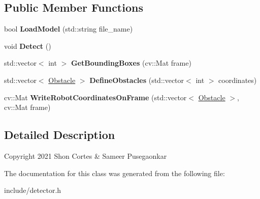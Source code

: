 \subsection*{Public Member Functions}
\begin{DoxyCompactItemize}
\item 
\mbox{\label{classDetector_a340608cd637b240cb148571874b07cea}} 
bool {\bfseries Load\+Model} (std\+::string file\+\_\+name)
\item 
\mbox{\label{classDetector_ad50335bb7eff38205606ad6933193c29}} 
void {\bfseries Detect} ()
\item 
\mbox{\label{classDetector_a9f8e377533364eb2b8d936610bf1f9d6}} 
std\+::vector$<$ int $>$ {\bfseries Get\+Bounding\+Boxes} (cv\+::\+Mat frame)
\item 
\mbox{\label{classDetector_a6df343764a127ebcf45e19a7e4698c6c}} 
std\+::vector$<$ \hyperlink{classObstacle}{Obstacle} $>$ {\bfseries Define\+Obstacles} (std\+::vector$<$ int $>$ coordinates)
\item 
\mbox{\label{classDetector_a2deb549f198c279abcd261a4977e3236}} 
cv\+::\+Mat {\bfseries Write\+Robot\+Coordinates\+On\+Frame} (std\+::vector$<$ \hyperlink{classObstacle}{Obstacle} $>$, cv\+::\+Mat frame)
\end{DoxyCompactItemize}


\subsection{Detailed Description}
Copyright 2021  Shon Cortes \& Sameer Pusegaonkar 

The documentation for this class was generated from the following file\+:\begin{DoxyCompactItemize}
\item 
include/detector.\+h\end{DoxyCompactItemize}
